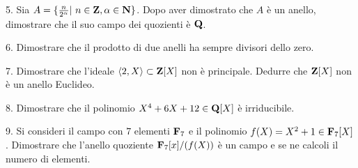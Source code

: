 \item{5.} Sia $A=\{{n\over 2^\alpha}|\ n\in{\bf Z}, \alpha\in{\bf N}\}$. Dopo aver dimostrato che $A$ \`e un
anello, dimostrare che il suo campo dei quozienti \`e ${\bf Q}$.\ve\vs

\item{6.} Dimostrare che il prodotto di due anelli ha sempre divisori dello zero.
\vv

\item{7.} Dimostrare che l'ideale $\langle 2,X\rangle\subset{\bf Z}[X]$ non \`e principale. Dedurre che ${\bf Z}[X]$ 
non \`e un anello Euclideo.
\ve \vs

\item{8.} Dimostrare che il polinomio $X^4+6X+12\in{\bf Q}[X]$ \`e irriducibile.
\vv\vv

\item{9.} Si consideri il campo con $7$ elementi ${\bf F}_7$ e il  polinomio $f(X)=X^2+1\in{\bf F}_7[X]$. Dimostrare che l'anello
quoziente ${\bf F}_7[x]/(f(X))$ \`e un campo e se ne calcoli il numero di elementi.
\ \vst

 \bye
